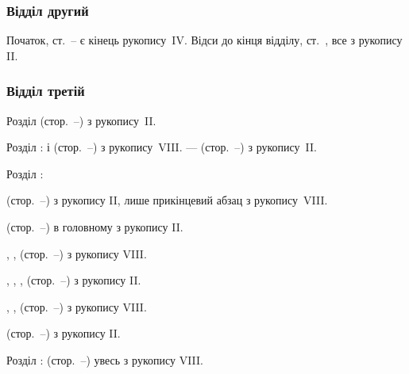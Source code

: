 \subsubsection*{Відділ другий}

Початок, ст.~\pageref{original-104}--\pageref{original-112} є кінець рукопису~IV.
Відси до кінця відділу, ст.~\pageref{original-266}, все з рукопису II.

\subsubsection*{Відділ третій}

Розділ  (стор.~\pageref{original-267}--\pageref{original-273}) з рукопису~II.

\noindent{}Розділ :  і  (стор.~\pageref{original-274}--\pageref{original-298}) з рукопису~VIII.
—  (стор.~\pageref{original-298}--\pageref{original-300-1}) з рукопису~II.

\noindent{}Розділ :

 (стор.~\pageref{original-300-2}--\pageref{original-302-1}) з рукопису II,
лише прикінцевий абзац з рукопису~VIII.

 (стор.~\pageref{original-303}--\pageref{original-305-1}) в головному з рукопису II.

, ,  (стор.~\pageref{original-305-2}--\pageref{original-325-1}) з рукопису VIII.

, , , 
(стор.~\pageref{original-325-2}--\pageref{original-337}) з рукопису II.

, , 
(стор.~\pageref{original-338}--\pageref{original-373-1}) з рукопису VIII.

 (стор.~\pageref{original-373-2}--\pageref{original-380-1}) з рукопису II.

\noindent{}Розділ : (стор.~\pageref{original-380-2}--\pageref{original-409}) увесь з рукопису VIII.



% 







\parbreak{}  %
